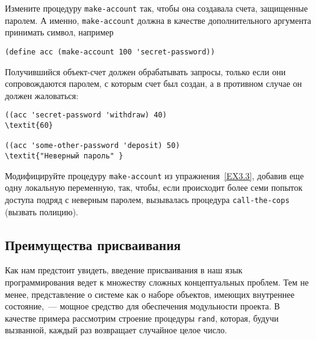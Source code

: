 \begin{exercise}{3.3}\label{EX3.3}%
Измените процедуру {\tt make-account} так,
чтобы она создавала
%
%
%
счета, защищенные паролем.  А именно,
{\tt make-account} должна
в качестве дополнительного аргумента принимать символ, например\-

\begin{Verbatim}[fontsize=\small]
(define acc (make-account 100 'secret-password))
\end{Verbatim}
Получившийся объект-счет должен обрабатывать запросы, только если они
сопровождаются паролем, с которым счет был создан, а в противном
случае он должен жаловаться:

\begin{Verbatim}[fontsize=\small]
((acc 'secret-password 'withdraw) 40)
\textit{60}

((acc 'some-other-password 'deposit) 50)
\textit{"Неверный пароль" }
\end{Verbatim}
\end{exercise}
\begin{exercise}{3.4}\label{EX3.4}%
Модифицируйте процедуру {\tt make-account} из
упражнения~\ref{EX3.3}, добавив еще одну локальную
переменную, так, чтобы, если происходит более семи попыток доступа подряд
с неверным паролем, вызывалась процедура {\tt call-the-cops}
(вызвать полицию).
\end{exercise}

\subsection{Преимущества
присваивания}
\label{THE-BENEFITS-OF-INTRODUCING-ASSIGNMENT}

Как нам предстоит увидеть, введение присваивания в наш язык
программирования ведет  к множеству сложных концептуальных проблем.
Тем не менее, представление о системе как о наборе объектов, имеющих
внутреннее состояние,~--- мощное средство для обеспечения модульности
проекта.  В качестве примера рассмотрим строение процедуры
{\tt rand}, которая, будучи вызванной, каждый раз возвращает
случайное целое число.

